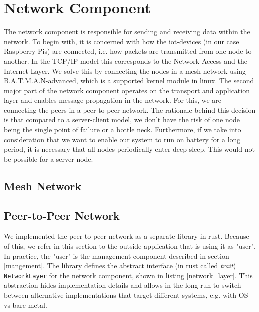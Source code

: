 \section{Network Component}\label{network}

The network component is responsible for sending and receiving data within the network. 
To begin with, it is concerned with how the iot-devices (in our case Raspberry Pis) are connected, i.e. how packets are transmitted from one node to another.
In the TCP/IP model this corresponds to the Network Access and the Internet Layer.
We solve this by connecting the nodes in a mesh network using B.A.T.M.A.N-advanced, which is a supported kernel module in linux. 
The second major part of the network component operates on the transport and application layer and enables message propagation in the network. 
For this, we are connecting the peers in a peer-to-peer network.
The rationale behind this decision is that compared to a server-client model, we don't have the risk of one node being the single point of failure or a bottle neck. 
Furthermore, if we take into consideration that we want to enable our system to run on battery for a long period, it is necessary that all nodes periodically enter deep sleep. 
This would not be possible for a server node.

\subsection{Mesh Network}\label{mesh-network}


\subsection{Peer-to-Peer Network}\label{p2p-network}

We implemented the peer-to-peer network as a separate library in rust.
Because of this, we refer in this section to the outside application that is using it as "user". 
In practice, the "user" is the management component described in section \ref{mangement}.
The library defines the abstract interface (in rust called \textit{trait}) \lstinline{NetworkLayer} for the network component, shown in listing \ref{network_layer}.
This abstraction hides implementation details and allows in the long run to switch between alternative implementations that target different systems, e.g. with OS vs bare-metal.

